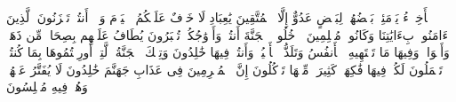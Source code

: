 \stopbuffer
\startbuffer[\q:43:67]
ٱلۡأَخِلَّاۤءُ یَوۡمَئِذِۭ بَعۡضُهُمۡ لِبَعۡضٍ عَدُوٌّ إِلَّا ٱلۡمُتَّقِینَ%
\stopbuffer
\startbuffer[\q:43:68]
یَٰعِبَادِ لَا خَوۡفٌ عَلَیۡكُمُ ٱلۡیَوۡمَ وَلَاۤ أَنتُمۡ تَحۡزَنُونَ%
\stopbuffer
\startbuffer[\q:43:69]
ٱلَّذِینَ ءَامَنُوا۟ بِءَایَٰتِنَا وَكَانُوا۟ مُسۡلِمِینَ%
\stopbuffer
\startbuffer[\q:43:70]
ٱدۡخُلُوا۟ ٱلۡجَنَّةَ أَنتُمۡ وَأَزۡوَٰجُكُمۡ تُحۡبَرُونَ%
\stopbuffer
\startbuffer[\q:43:71]
یُطَافُ عَلَیۡهِم بِصِحَافࣲ مِّن ذَهَبࣲ وَأَكۡوَابࣲۖ وَفِیهَا مَا تَشۡتَهِیهِ ٱلۡأَنفُسُ وَتَلَذُّ ٱلۡأَعۡیُنُۖ وَأَنتُمۡ فِیهَا خَٰلِدُونَ%
\stopbuffer
\startbuffer[\q:43:72]
وَتِلۡكَ ٱلۡجَنَّةُ ٱلَّتِیۤ أُورِثۡتُمُوهَا بِمَا كُنتُمۡ تَعۡمَلُونَ%
\stopbuffer
\startbuffer[\q:43:73]
لَكُمۡ فِیهَا فَٰكِهَةࣱ كَثِیرَةࣱ مِّنۡهَا تَأۡكُلُونَ%
\stopbuffer
\startbuffer[\q:43:74]
إِنَّ ٱلۡمُجۡرِمِینَ فِی عَذَابِ جَهَنَّمَ خَٰلِدُونَ%
\stopbuffer
\startbuffer[\q:43:75]
لَا یُفَتَّرُ عَنۡهُمۡ وَهُمۡ فِیهِ مُبۡلِسُونَ%
\stopbuffer
